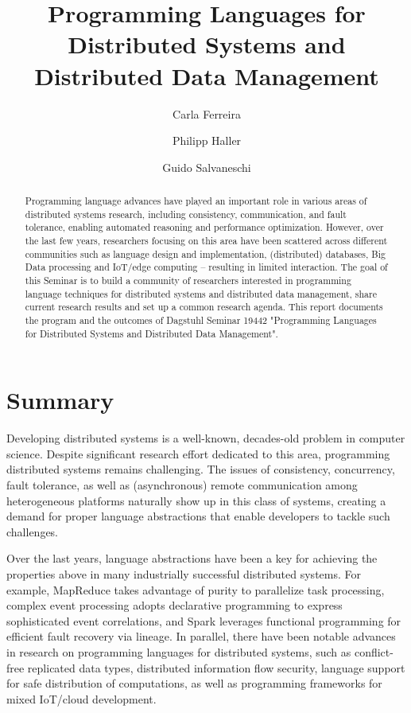 \documentclass[a4paper,UKenglish]{dagrep-v2018}
\title{Programming Languages for Distributed Systems and Distributed Data Management}
\author[1]{Carla Ferreira}
\author[2]{Philipp Haller}
\author[3]{Guido Salvaneschi}
\affil[1]{New University of Lisbon, PT, \texttt{carla.ferreira@fct.unl.pt}}
\affil[2]{KTH Royal Institute of Technology - Stockholm, SE, \texttt{phaller@kth.se}}
\affil[3]{TU Darmstadt, DE, \texttt{salvaneschi@st.informatik.tu-darmstadt.de}}
\begin{document}
\maketitle

\begin{abstract}
Programming language advances have played an 
important role in various areas of distributed systems research, including 
consistency, communication, and fault tolerance, enabling automated reasoning
and performance optimization.
However, over the last few years, researchers focusing on this area 
have been scattered across different communities such as
language design and implementation, (distributed) databases,
Big Data processing and IoT/edge computing -- resulting in limited interaction.
The goal of this Seminar is to build a community of researchers interested in 
programming language techniques for distributed systems and distributed data management, 
share current research results and set up a common research agenda. 
This report documents the program and the outcomes of Dagstuhl Seminar 19442 "Programming Languages for Distributed Systems and Distributed Data Management".
\end{abstract}

\section{Summary}

Developing distributed systems is a well-known, decades-old problem in computer science. Despite significant research effort dedicated to this area, programming distributed systems remains challenging. The issues of consistency, concurrency, fault tolerance, as well as (asynchronous) remote communication among heterogeneous platforms naturally show up in this class of systems, creating a demand for proper language abstractions that enable developers to tackle such challenges.

Over the last years, language abstractions have been a key for achieving the properties above in many industrially successful distributed systems. For example, MapReduce takes advantage of purity to parallelize task processing, complex event processing adopts declarative programming to express sophisticated event correlations, and Spark leverages functional programming for efficient fault recovery via lineage. In parallel, there have been notable advances in research on programming languages for distributed systems, such as conflict-free replicated data types, distributed information flow security, language support for safe distribution of computations, as well as programming frameworks for mixed IoT/cloud development.
\end{document}
